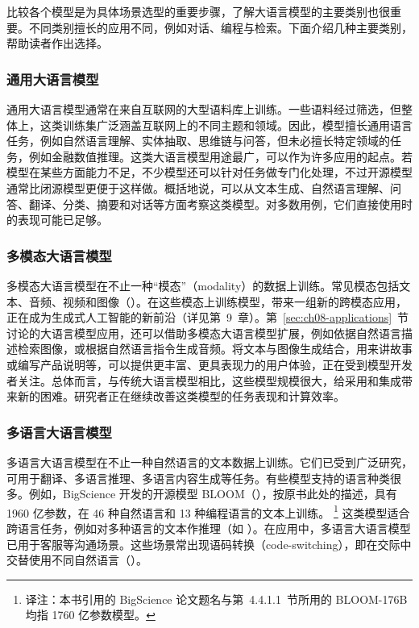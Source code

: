 比较各个模型是为具体场景选型的重要步骤，了解大语言模型的主要类别也很重要。不同类别擅长的应用不同，例如对话、编程与检索。下面介绍几种主要类别，帮助读者作出选择。

\subsubsection{通用大语言模型}
通用大语言模型通常在来自互联网的大型语料库上训练。一些语料经过筛选，但整体上，这类训练集广泛涵盖互联网上的不同主题和领域。因此，模型擅长通用语言任务，例如自然语言理解、实体抽取、思维链与问答，但未必擅长特定领域的任务，例如金融数值推理。这类大语言模型用途最广，可以作为许多应用的起点。若模型在某些方面能力不足，不少模型还可以针对任务做专门化处理，不过开源模型通常比闭源模型更便于这样做。概括地说，可以从文本生成、自然语言理解、问答、翻译、分类、摘要和对话等方面考察这类模型。对多数用例，它们直接使用时的表现可能已足够。

\subsubsection{多模态大语言模型}
多模态大语言模型在不止一种“模态”（modality）的数据上训练。常见模态包括文本、音频、视频和图像（）。在这些模态上训练模型，带来一组新的跨模态应用，正在成为生成式人工智能的新前沿（详见第~9~章）。第~\ref{sec:ch08-applications}~节讨论的大语言模型应用，还可以借助多模态大语言模型扩展，例如依据自然语言描述检索图像，或根据自然语言指令生成音频。将文本与图像生成结合，用来讲故事或编写产品说明等，可以提供更丰富、更具表现力的用户体验，正在受到模型开发者关注。总体而言，与传统大语言模型相比，这些模型规模很大，给采用和集成带来新的困难。研究者正在继续改善这类模型的任务表现和计算效率。

\subsubsection{多语言大语言模型}
多语言大语言模型在不止一种自然语言的文本数据上训练。它们已受到广泛研究，可用于翻译、多语言推理、多语言内容生成等任务。有些模型支持的语言种类很多。例如，BigScience 开发的开源模型 BLOOM（），按原书此处的描述，具有 1960 亿参数，在 46 种自然语言和 13 种编程语言的文本上训练。%
\footnote{译注：本书引用的 BigScience 论文题名与第~4.4.1.1~节所用的 BLOOM-176B 均指 1760 亿参数模型。}
这类模型适合跨语言任务，例如对多种语言的文本作推理（如 ）。在应用中，多语言大语言模型已用于客服等沟通场景。这些场景常出现语码转换（code-switching），即在交际中交替使用不同自然语言（）。

